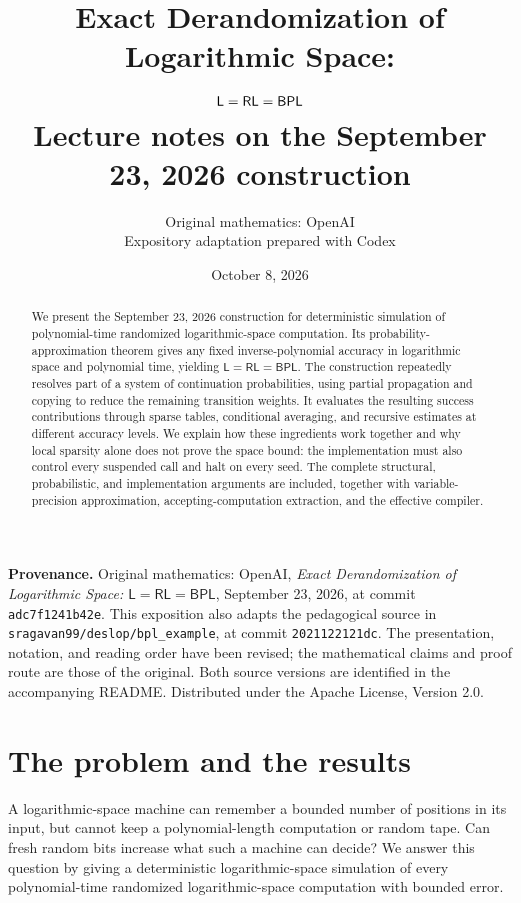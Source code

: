 \documentclass[11pt]{article}
\title{Exact Derandomization of Logarithmic Space:\protect\\
 $\Lclass=\RL=\BPL$\protect\\[6pt]
 \large Lecture notes on the September 23, 2026 construction}
\author{Original mathematics: OpenAI\\[3pt]\normalsize Expository adaptation prepared with Codex}
\date{October 8, 2026}
\numberwithin{equation}{section}
\theoremstyle{definition}
\theoremstyle{remark}
\newcommand{\RL}{\mathsf{RL}}
\newcommand{\Lclass}{\mathsf L}
\newcommand{\BPL}{\mathsf{BPL}}
\begin{document}
\maketitle
\begin{abstract}
We present the September 23, 2026 construction for deterministic simulation of polynomial-time randomized logarithmic-space computation. Its probability-approximation theorem gives any fixed inverse-polynomial accuracy in logarithmic space and polynomial time, yielding $\Lclass=\RL=\BPL$. The construction repeatedly resolves part of a system of continuation probabilities, using partial propagation and copying to reduce the remaining transition weights. It evaluates the resulting success contributions through sparse tables, conditional averaging, and recursive estimates at different accuracy levels. We explain how these ingredients work together and why local sparsity alone does not prove the space bound: the implementation must also control every suspended call and halt on every seed. The complete structural, probabilistic, and implementation arguments are included, together with variable-precision approximation, accepting-computation extraction, and the effective compiler.
\end{abstract}

\begingroup\small
\noindent\textbf{Provenance.} Original mathematics: OpenAI, \emph{Exact Derandomization of Logarithmic Space: $\Lclass=\RL=\BPL$}, September 23, 2026, at commit \texttt{adc7f1241b42e}. This exposition also adapts the pedagogical source in \texttt{sragavan99/deslop/bpl\_example}, at commit \texttt{2021122121dc}. The presentation, notation, and reading order have been revised; the mathematical claims and proof route are those of the original. Both source versions are identified in the accompanying README. Distributed under the Apache License, Version 2.0.
\par\endgroup

\clearpage
\begingroup\small
\tableofcontents
\endgroup
\clearpage

\section{The problem and the results}\label{sec:intro}

A logarithmic-space machine can remember a bounded number of positions
in its input, but cannot keep a polynomial-length computation or random
tape. Can fresh random bits increase what such a machine can decide?
We answer this question by giving a deterministic logarithmic-space
simulation of every polynomial-time randomized logarithmic-space
computation with bounded error.
\end{document}
